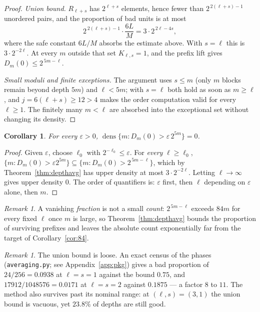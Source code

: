 \documentclass[11pt,a4paper]{article}
\theoremstyle{plain}
\newtheorem{corollary}[theorem]{Corollary}
\theoremstyle{definition}
\theoremstyle{remark}
\newtheorem{remark}[theorem]{Remark}
\begin{document}
\begin{proof}
\emph{Union bound.} $R_{\ell+s}$ has $2^{\ell+s}$ elements, hence fewer than
$2^{\,2(\ell+s)-1}$ unordered pairs, and the proportion of bad units is at most
\[
2^{\,2(\ell+s)-1}\cdot\frac{6L}{M}=3\cdot2^{\,2\ell-4s},
\]
where the safe constant $6L/M$ absorbs the estimate above. With $s=\ell$ this
is $3\cdot2^{-2\ell}$. At every $m$ outside that set $K_{\ell,s}=1$, and the
prefix lift gives $D_m(0)\le2^{\,5m-\ell}$.

\emph{Small moduli and finite exceptions.} The argument uses $s\le m$ (only $m$
blocks remain beyond depth $5m$) and $\ell<5m$; with $s=\ell$ both hold as soon
as $m\ge\ell$, and $j=6(\ell+s)\ge12>4$ makes the order computation valid for
every $\ell\ge1$. The finitely many $m<\ell$ are absorbed into the exceptional
set without changing its density.
\end{proof}

\begin{corollary}\label{cor:dens}
For every $\varepsilon>0$,
$\operatorname{dens}\{m:D_m(0)>\varepsilon\,2^{5m}\}=0$.
\end{corollary}

\begin{proof}
Given $\varepsilon$, choose $\ell_0$ with $2^{-\ell_0}\le\varepsilon$. For
\emph{every} $\ell\ge\ell_0$,
$\{m:D_m(0)>\varepsilon2^{5m}\}\subseteq\{m:D_m(0)>2^{\,5m-\ell}\}$, which by
Theorem~\ref{thm:depthavg} has upper density at most $3\cdot2^{-2\ell}$.
Letting $\ell\to\infty$ gives upper density $0$. The order of quantifiers is:
$\varepsilon$ first, then $\ell$ depending on $\varepsilon$ alone, then $m$.
\end{proof}

\begin{remark}
A vanishing \emph{fraction} is not a small \emph{count}: $2^{\,5m-\ell}$ exceeds
$84m$ for every fixed $\ell$ once $m$ is large, so Theorem~\ref{thm:depthavg}
bounds the proportion of surviving prefixes and leaves the absolute count
exponentially far from the target of Corollary~\ref{cor:84}.
\end{remark}

\begin{remark}
The union bound is loose. An exact census of the phases
(\texttt{averaging.py}; see Appendix~\ref{app:pkg}) gives a bad proportion of
$24/256=0.0938$ at $\ell=s=1$ against the bound $0.75$, and
$17912/1048576=0.0171$ at $\ell=s=2$ against $0.1875$ --- a factor $8$ to $11$.
The method also survives past its nominal range: at $(\ell,s)=(3,1)$ the union
bound is vacuous, yet $23.8\%$ of depths are still good.
\end{remark}
\end{document}
